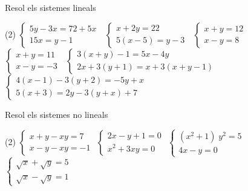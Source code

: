 \documentclass[11pt, a4paper, pdf]{article}
\begin{document}
\begin{mylist}
 
 \item   Resol els sistemes lineals
 \begin{tasks}(2)
 	\task $\left\{\begin{array}{l} {5y-3x=72+5x} \\ {15x=y-1} \end{array}\right. \; $    
 	\task  $\left\{\begin{array}{l} {x+2y=22} \\ {5(x-5)=y-3} \end{array}\right. \; $  
 	\task  $\left\{\begin{array}{l} {x+y=12} \\ {x-y=8} \end{array}\right. \; $      
 	\task  $\left\{\begin{array}{l} {x+y=11} \\ {x-y=-3} \end{array}\right. \; $  
 	\task $\left\{\begin{array}{l} {3(x+y)-1=5x-4y} \\ {2x+3(y+1)=x+3(x+y-1)} \end{array}\right. \; $  
 	\task  $\left\{\begin{array}{l} {4(x-1)-3(y+2)=-5y+x} \\ {5(x+3)=2y-3(y+x)+7} \end{array}\right. \; $
 \end{tasks}
 
 \item  Resol els sistemes no lineals
 \begin{tasks}(2)
 	\task  $\left\{\begin{array}{l} {x+y-xy=7} \\ {x-y-xy=-1} \end{array}\right. $       
 	\task  $\left\{\begin{array}{l} {2x-y+1=0} \\ {x^{2} +3xy=0} \end{array}\right. $ 
 	\task  $\left\{\begin{array}{l} {(x^{2} +1)\; y^{2} =5} \\ {4x-y=0} \end{array}\right. $             
 	\task  $\left\{\begin{array}{l} {\sqrt{x} +\sqrt{y} =5} \\ {\sqrt{x} -\sqrt{y} =1} \end{array}\right. $ 
 \end{tasks}
 
\end{mylist}
 
\end{document}
